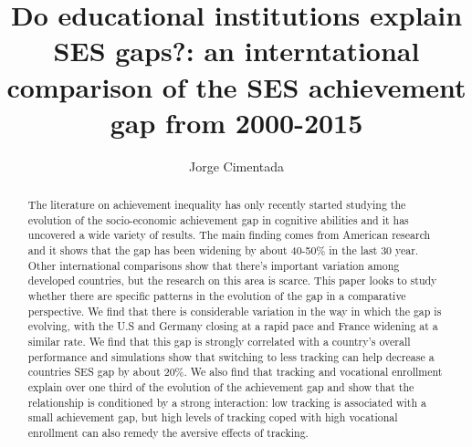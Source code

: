 \documentclass[11pt, a4paper]{article}\usepackage[]{graphicx}\usepackage[]{color}
\title{Do educational institutions explain SES gaps?: an interntational comparison of the SES achievement gap from 2000-2015}
\author{Jorge Cimentada}
\begin{document}
\setlength{\parindent}{2em}
\setlength{\parskip}{1em}

\maketitle





\begin{abstract}
The literature on achievement inequality has only recently started studying the evolution of the socio-economic achievement gap in cognitive abilities and it has uncovered a wide variety of results. The main finding comes from American research and it shows that the gap has been widening by about 40-50\% in the last 30 year. Other international comparisons show that there's important variation among developed countries, but the research on this area is scarce. This paper looks to study whether there are specific patterns in the evolution of the gap in a comparative perspective. We find that there is considerable variation in the way in which the gap is evolving, with the U.S and Germany closing at a rapid pace and France widening at a similar rate. We find that this gap is strongly correlated with a country's overall performance and simulations show that switching to less tracking can help decrease a countries SES gap by about 20\%. We also find that tracking and vocational enrollment explain over one third of the evolution of the achievement gap and show that the relationship is conditioned by a strong interaction: low tracking is associated with a small achievement gap, but high levels of tracking coped with high vocational enrollment can also remedy the aversive effects of tracking.
\end{abstract}












\end{document}
